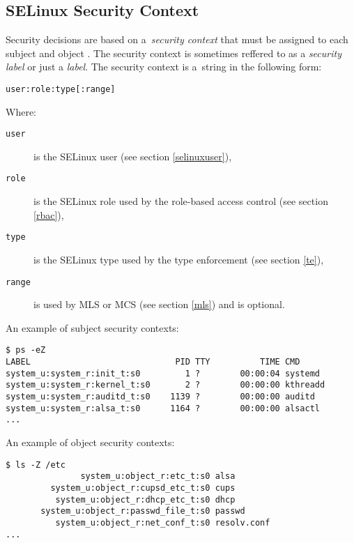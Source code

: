 \subsection{SELinux Security Context}
\label{context}
Security decisions are based on a~\emph{security context} that must be assigned
to each subject and object \cite[pp.~27--28]{tsn}. The security context is
sometimes reffered to as a \emph{security label} or just a \emph{label}. The
security context is a~string in the following form:
\begin{lstlisting}
user:role:type[:range]
\end{lstlisting}
Where:
\begin{description}
    \item [\texttt{user}] is the SELinux user (see section \ref{selinuxuser}),
    \item [\texttt{role}] is the SELinux role used by the role-based access
        control (see section \ref{rbac}),
    \item [\texttt{type}] is the SELinux type used by the type enforcement (see
        section \ref{te}),
    \item [\texttt{range}] is used by MLS or MCS (see section \ref{mls}) and is
        optional.
\end{description}

\pagebreak

An example of subject security contexts:
\begin{lstlisting}
$ ps -eZ
LABEL                             PID TTY          TIME CMD
system_u:system_r:init_t:s0         1 ?        00:00:04 systemd
system_u:system_r:kernel_t:s0       2 ?        00:00:00 kthreadd
system_u:system_r:auditd_t:s0    1139 ?        00:00:00 auditd
system_u:system_r:alsa_t:s0      1164 ?        00:00:00 alsactl
...
\end{lstlisting}

An example of object security contexts:
\begin{lstlisting}
$ ls -Z /etc
               system_u:object_r:etc_t:s0 alsa
         system_u:object_r:cupsd_etc_t:s0 cups
          system_u:object_r:dhcp_etc_t:s0 dhcp
       system_u:object_r:passwd_file_t:s0 passwd
          system_u:object_r:net_conf_t:s0 resolv.conf
...
\end{lstlisting}

